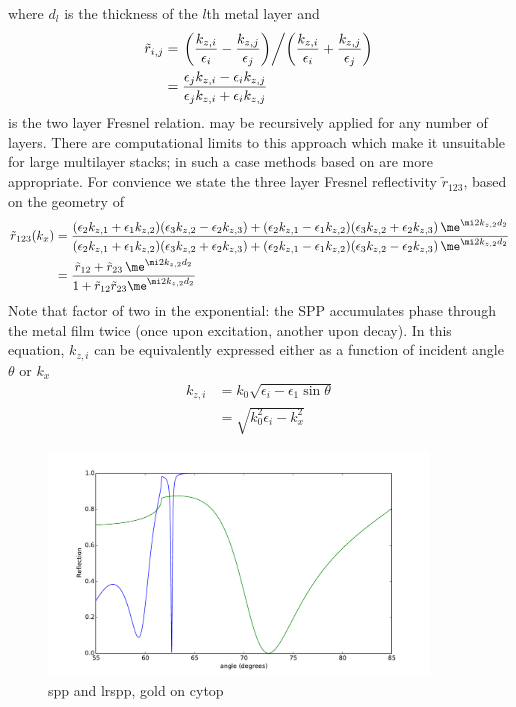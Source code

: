 where $d_l$ is the thickness of the $l$th metal layer and 
\begin{align}
\tilde{r}_{i,j}&=
\left.\left(\frac{k_{z,i}}{\epsilon_i}-\frac{k_{z,j}}{\epsilon_j}\right)
\middle/
\left(\frac{k_{z,i}}{\epsilon_i}+\frac{k_{z,j}}{\epsilon_j}\right)\right.\\
&=\frac{\epsilon_j k_{z,i}-\epsilon_i k_{z,j}}
{\epsilon_j k_{z,i}+\epsilon_i k_{z,j}}
\end{align}
is the two layer Fresnel relation.   may be
recursively applied for any number of layers.  There are computational
limits to this approach which make it unsuitable for large multilayer
stacks; in such a case methods based on  are more
appropriate.  For convience we state the three layer Fresnel reflectivity
$\tilde{r}_{123}$, based on the geometry of 
\begin{align}
\tilde{r}_{123}(k_x) &=
\frac{
  (\epsilon_2 k_{z,1}+\epsilon_1 k_{z,2})(\epsilon_3 k_{z,2}-\epsilon_2 k_{z,3})
+ (\epsilon_2 k_{z,1}-\epsilon_1 k_{z,2})(\epsilon_3 k_{z,2}+\epsilon_2 k_{z,3})\,
\me^{\mi 2 k_{z,2} d_2}
}
{
  (\epsilon_2 k_{z,1}+\epsilon_1 k_{z,2})(\epsilon_3 k_{z,2}+\epsilon_2 k_{z,3})
+ (\epsilon_2 k_{z,1}-\epsilon_1 k_{z,2})(\epsilon_3 k_{z,2}-\epsilon_2 k_{z,3})\,
\me^{\mi 2 k_{z,2} d_2}
}\\
&=
\frac{\tilde{r}_{12}+\tilde{r}_{23}\, \me^{\mi 2 k_{z,2} d_2}} {1+\tilde{r}_{12} \tilde{r}_{23} \me^{\mi 2 k_{z,2} d_2}}
\label{eqn:fresnel123}
\end{align}
Note that factor of two in the exponential: the SPP accumulates phase
through the metal film twice (once upon excitation, another upon decay).
In this equation, $k_{z,i}$ can be equivalently expressed either as a
function of incident angle $\theta$ or $k_x$
\begin{align}
k_{z,i} &= k_0 \sqrt{\epsilon_i - \epsilon_1 \sin \theta}\\
&= \sqrt{k_0^2\epsilon_i - k_x^2}
\end{align}

\begin{figure}
\includegraphics[width=0.9\textwidth,keepaspectratio]{figures/fresnelspp_ersatz.pdf}
\caption{spp and lrspp, gold on cytop}
\end{figure}

